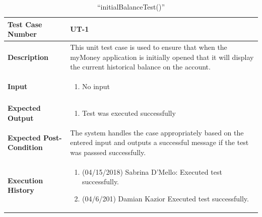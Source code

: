 \documentclass[12pt]{article}
\begin{document}
\begin{table}[H]
\caption{“initialBalanceTest()”}
\begin{center}
\begin{tabular}{|p{5.5cm}|p{11cm}|}
  \hline
  \bf Test Case Number & UT-1\\\hline
  \bf Description & 
  This unit test case is used to ensure that when the myMoney application is initially opened that it will display the current historical balance on the account.\\\hline
  \bf Input &
  \begin{enumerate}
  \item No input
  \end{enumerate}
  \\\hline
  \bf Expected Output &
  \begin{enumerate}
  \item Test was executed successfully
  \end{enumerate}
  \\\hline
  \bf Expected Post-Condition & 
  The system handles the case appropriately based on the entered input and outputs a successful message if the test was passsed successfully.
  \\\hline   
  \bf Execution History & 
  \begin{enumerate}
  \item (04/15/2018) Sabrina D’Mello: Executed test successfully.
  \item (04/6/201) Damian Kazior Executed test successfully.
  \end{enumerate}
  \\\hline
\end{tabular}
\end{center}
\end{table}
\end{document}
